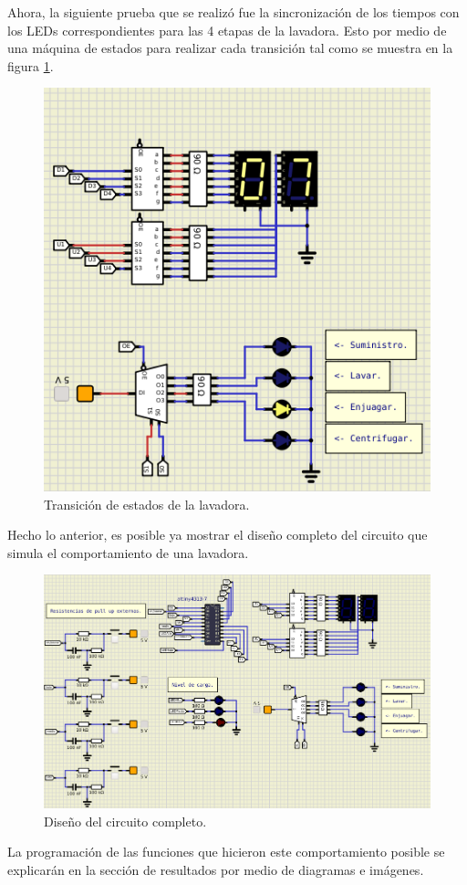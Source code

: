 Ahora, la siguiente prueba que se realizó fue la sincronización de los tiempos con los LEDs correspondientes para las 4 etapas de la lavadora. Esto por medio de una máquina de estados para realizar cada transición tal como se muestra en la figura \ref{fig15}.
\begin{figure}[H]
        \centering
        \includegraphics[width=.7\linewidth]{Imagenes/9.png}
        \caption{Transición de estados de la lavadora.}
        \label{fig15}
    \end{figure}
Hecho lo anterior, es posible ya mostrar el diseño completo del circuito que simula el comportamiento de una lavadora.
\begin{figure}[H]
        \centering
        \includegraphics[width=.7\linewidth]{Imagenes/10.png}
        \caption{Diseño del circuito completo.}
        \label{fig16}
    \end{figure}
La programación de las funciones que hicieron este comportamiento posible se explicarán en la sección de resultados por medio de diagramas e imágenes.




\newpage